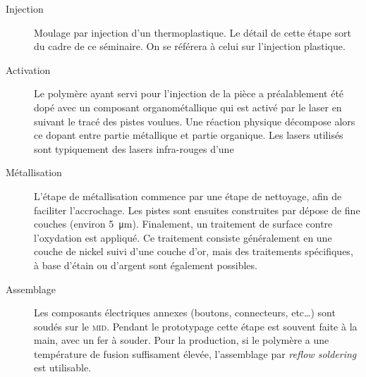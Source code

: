 \begin{description}
    \item[Injection] Moulage par injection d'un thermoplastique. Le détail de cette étape
        sort du cadre de ce séminaire. On se référera à celui sur l'injection
        plastique. 
    \item[Activation] Le polymère ayant servi pour l'injection de la pièce a
        préalablement été
        dopé avec un composant organométallique qui est activé par le laser en
        suivant le tracé des pistes voulues. Une réaction physique décompose
        alors ce dopant entre partie métallique et partie organique.
        Les lasers utilisés sont typiquement des lasers infra-rouges d'une
    \item[Métallisation] L'étape de métallisation commence par une étape de
        nettoyage, afin de faciliter l'accrochage. Les pistes sont ensuites
        construites par dépose de fine couches (environ \SI{5}{\micro\meter}).
        Finalement, un traitement de surface contre l'oxydation est appliqué. Ce
        traitement consiste généralement en une couche de nickel suivi d'une
        couche d'or, mais des traitements spécifiques, à base d'étain ou
        d'argent sont également possibles.
    \item[Assemblage] Les composants électriques annexes (boutons, connecteurs,
        etc\ldots) sont soudés sur le \textsc{mid}. Pendant le prototypage cette
        étape est souvent faite à la main, avec un fer à souder. Pour la
        production, si le polymère a une température de fusion suffisament
        élevée, l'assemblage par \emph{reflow soldering} est utilisable. 
\end{description}
